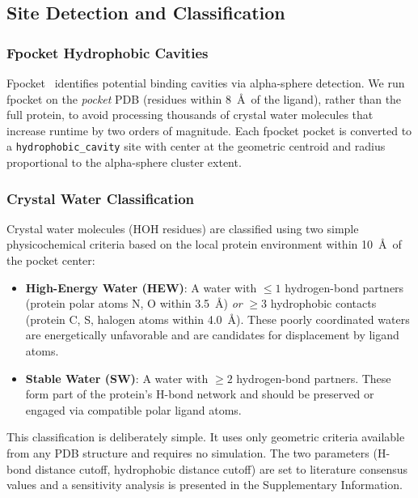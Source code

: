 \documentclass[journal=jcisd,manuscript=article]{achemso}
\begin{document}
\subsection{Site Detection and Classification}

\subsubsection{Fpocket Hydrophobic Cavities}

Fpocket~\cite{RN17} identifies potential binding cavities via alpha-sphere detection.
We run fpocket on the \emph{pocket} PDB (residues within 8~\AA\ of the ligand),
rather than the full protein, to avoid processing thousands of crystal water
molecules that increase runtime by two orders of magnitude. Each fpocket pocket
is converted to a \texttt{hydrophobic\_cavity} site with center at the geometric
centroid and radius proportional to the alpha-sphere cluster extent.

\subsubsection{Crystal Water Classification}

Crystal water molecules (HOH residues) are classified using two simple
physicochemical criteria based on the local protein environment within
10~\AA\ of the pocket center:

\begin{itemize}
    \item \textbf{High-Energy Water (HEW)}: A water with $\leq 1$ hydrogen-bond
          partners (protein polar atoms N, O within 3.5~\AA) \emph{or}
          $\geq 3$ hydrophobic contacts (protein C, S, halogen atoms within
          4.0~\AA). These poorly coordinated waters are energetically unfavorable
          and are candidates for displacement by ligand atoms.
    \item \textbf{Stable Water (SW)}: A water with $\geq 2$
          hydrogen-bond partners. These form part of the protein's
          H-bond network and should be preserved or engaged via
          compatible polar ligand atoms.
\end{itemize}

This classification is deliberately simple. It uses only geometric criteria
available from any PDB structure and requires no simulation. The two parameters
(H-bond distance cutoff, hydrophobic distance cutoff) are set to literature
consensus values and a sensitivity analysis is presented in the Supplementary
Information.
\end{document}
